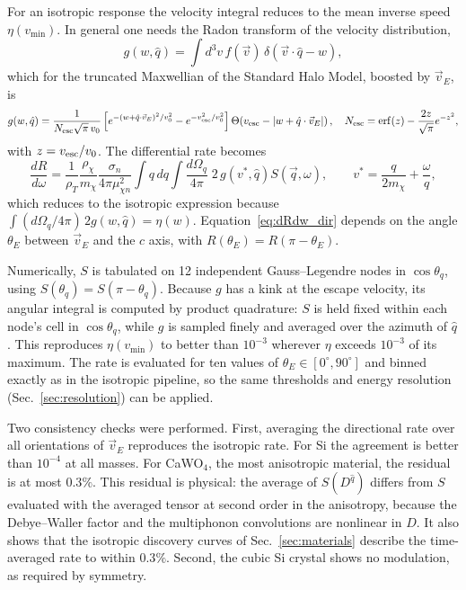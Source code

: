 For an isotropic response the velocity integral reduces to the mean inverse speed
$\eta(v_{\min})$. In general one needs the Radon transform of the velocity distribution,
\begin{equation}
  g(w,\hat q) = \int d^3v\, f(\vec v)\,\delta\!\left(\vec v\cdot\hat q - w\right),
\end{equation}
which for the truncated Maxwellian of the Standard Halo Model, boosted by $\vec v_E$, is
\begin{equation}
  g(w,\hat q) = \frac{1}{N_{\rm esc}\sqrt{\pi}\,v_0}
  \left[ e^{-(w+\hat q\cdot\vec v_E)^2/v_0^2} - e^{-v_{\rm esc}^2/v_0^2} \right]
  \Theta\!\left(v_{\rm esc}-|w+\hat q\cdot\vec v_E|\right),
  \quad
  N_{\rm esc} = \mathrm{erf}(z) - \frac{2z}{\sqrt\pi}e^{-z^2},
\end{equation}
with $z=v_{\rm esc}/v_0$. The differential rate becomes
\begin{equation}
  \frac{dR}{d\omega} = \frac{1}{\rho_T}\frac{\rho_\chi}{m_\chi}
  \frac{\sigma_n}{4\pi\mu_{\chi n}^2}
  \int q\,dq \int\frac{d\Omega_q}{4\pi}\;
  2\,g\!\left(v^*, \hat q\right) S(\vec q,\omega),
  \qquad
  v^* = \frac{q}{2m_\chi} + \frac{\omega}{q},
  \label{eq:dRdw_dir}
\end{equation}
which reduces to the isotropic expression because
$\int (d\Omega_q/4\pi)\, 2 g(w,\hat q) = \eta(w)$. Equation~\eqref{eq:dRdw_dir} depends
on the angle $\theta_E$ between $\vec v_E$ and the $c$ axis, with
$R(\theta_E) = R(\pi-\theta_E)$.

Numerically, $S$ is tabulated on 12 independent Gauss--Legendre nodes in
$\cos\theta_q$, using $S(\theta_q)=S(\pi-\theta_q)$. Because $g$ has a kink at the
escape velocity, its angular integral is computed by product quadrature: $S$ is held
fixed within each node's cell in $\cos\theta_q$, while $g$ is sampled finely and averaged
over the azimuth of $\hat q$. This reproduces $\eta(v_{\min})$ to better than
$10^{-3}$ wherever $\eta$ exceeds $10^{-3}$ of its maximum. The rate is evaluated for ten
values of $\theta_E \in [0^\circ,90^\circ]$ and binned exactly as in the isotropic
pipeline, so the same thresholds and energy resolution (Sec.~\ref{sec:resolution}) can
be applied.

Two consistency checks were performed. First, averaging the directional rate over all
orientations of $\vec v_E$ reproduces the isotropic rate. For Si the agreement is better
than $10^{-4}$ at all masses. For CaWO$_4$, the most anisotropic material, the residual
is at most $0.3\%$. This residual is physical: the average of $S(D^{\hat q})$ differs
from $S$ evaluated with the averaged tensor at second order in the anisotropy, because
the Debye--Waller factor and the multiphonon convolutions are nonlinear in $D$. It also
shows that the isotropic discovery curves of Sec.~\ref{sec:materials} describe the
time-averaged rate to within $0.3\%$. Second, the cubic Si crystal shows no modulation,
as required by symmetry.

